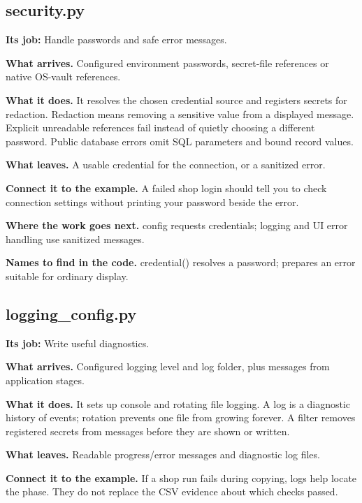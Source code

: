 \subsection{security.py}

\textbf{Its job:} Handle passwords and safe error messages.

\textbf{What arrives.} Configured environment passwords, secret-file references or native OS-vault references.

\textbf{What it does.} It resolves the chosen credential source and registers secrets for redaction. Redaction means removing a sensitive value from a displayed message. Explicit unreadable references fail instead of quietly choosing a different password. Public database errors omit SQL parameters and bound record values.

\textbf{What leaves.} A usable credential for the connection, or a sanitized error.

\textbf{Connect it to the example.} A failed shop login should tell you to check connection settings without printing your password beside the error.

\textbf{Where the work goes next.} config requests credentials; logging and UI error handling use sanitized messages.

\textbf{Names to find in the code.} credential() resolves a password;  prepares an error suitable for ordinary display.


\subsection{logging\_config.py}

\textbf{Its job:} Write useful diagnostics.

\textbf{What arrives.} Configured logging level and log folder, plus messages from application stages.

\textbf{What it does.} It sets up console and rotating file logging. A log is a diagnostic history of events; rotation prevents one file from growing forever. A filter removes registered secrets from messages before they are shown or written.

\textbf{What leaves.} Readable progress/error messages and diagnostic log files.

\textbf{Connect it to the example.} If a shop run fails during copying, logs help locate the phase. They do not replace the CSV evidence about which checks passed.

